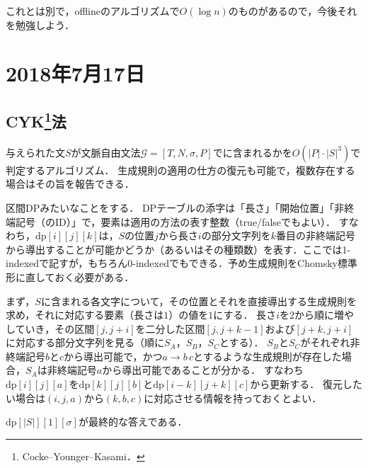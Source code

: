 \documentclass[a4paper]{jsarticle}
\begin{document}
これとは別で，offlineのアルゴリズムで$O(\log n)$のものがあるので，今後それを勉強しよう．

\section{2018年7月17日}
\subsection{CYK\protect\footnote{Cocke--Younger--Kasami．}法}

与えられた文$S$が文脈自由文法$\mathscr{G}=[T, N, \sigma, P]$でに含まれるかを$O(|P|\cdot|S|^3)$で判定するアルゴリズム．
生成規則の適用の仕方の復元も可能で，複数存在する場合はその旨を報告できる．

区間DPみたいなことをする．
DPテーブルの添字は「長さ」「開始位置」「非終端記号（のID）」で，要素は適用の方法の表す整数（true/falseでもよい）．
すなわち，$\mathrm{dp}[i][j][k]$は，$S$の位置$j$から長さ$i$の部分文字列を$k$番目の非終端記号から導出することが可能かどうか（あるいはその種類数）を表す．ここでは1-indexedで記すが，もちろん0-indexedでもできる．予め生成規則をChomsky標準形に直しておく必要がある．

まず，$S$に含まれる各文字について，その位置とそれを直接導出する生成規則を求め，それに対応する要素（長さは$1$）の値を$1$にする．
長さ$i$を$2$から順に増やしていき，その区間$[j, j+i]$を二分した区間$[j, j+k-1]$および$[j+k, j+i]$に対応する部分文字列を見る（順に$S_A$，$S_B$，$S_C$とする）．
$S_B$と$S_C$がそれぞれ非終端記号$b$と$c$から導出可能で，かつ$a\to b\,c$とするような生成規則が存在した場合，$S_A$は非終端記号$a$から導出可能であることが分かる．
すなわち$\mathrm{dp}[i][j][a]$を$\mathrm{dp}[k][j][b]$と$\mathrm{dp}[i-k][j+k][c]$から更新する．
復元したい場合は$(i, j, a)$から$(k, b, c)$に対応させる情報を持っておくとよい．

$\mathrm{dp}[|S|][1][\sigma]$が最終的な答えである．
\end{document}
